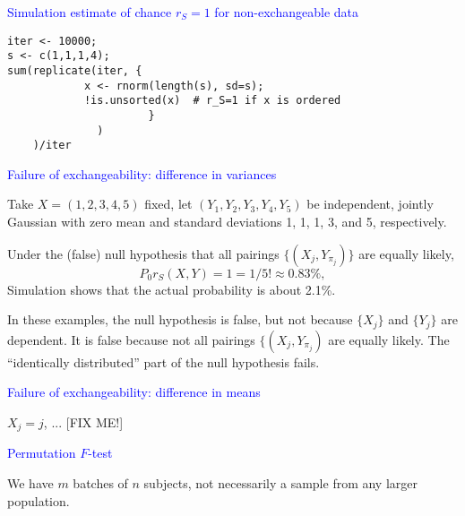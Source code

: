 \documentclass[landscape]{slides}
\newcommand{\beq}{\begin{equation}}
\newcommand{\eeq}{\end{equation}}
\begin{document}
\begin{slide}
\begin{slide}
\end{slide}

\begin{slide}
{\textcolor{blue}{Simulation estimate of chance $r_S = 1$ for non-exchangeable data}}

\begin{verbatim}
iter <- 10000;
s <- c(1,1,1,4);
sum(replicate(iter, {
            x <- rnorm(length(s), sd=s);
            !is.unsorted(x)  # r_S=1 if x is ordered
                      }
              )
    )/iter
\end{verbatim}

\end{slide}

\begin{slide}
{\textcolor{blue}{Failure of exchangeability: difference in variances}}

Take $X = (1, 2, 3, 4, 5)$ fixed,
let $(Y_1, Y_2, Y_3, Y_4, Y_5)$ be independent, jointly Gaussian 
with zero mean and standard deviations 1, 1, 1, 3, and 5, respectively.

Under the (false) null hypothesis that all pairings $\{(X_j, Y_{\pi_j})\}$ are 
equally likely,
\beq
     P_0{r_S(X, Y) = 1} = 1/5! \approx 0.83\%,
\eeq
Simulation shows that the actual probability is about 2.1\%.

In these examples, the null hypothesis is false, but not because
$\{X_j\}$ and $\{Y_j\}$ are dependent.
	It is false because not all pairings $\{(X_j, Y_{\pi_j})$
	are equally likely.
	The ``identically distributed'' part of the null hypothesis
	fails.
\end{slide}

\begin{slide}
{\textcolor{blue}{Failure of exchangeability: difference in means}}

$X_j = j$, ... [FIX ME!]

\end{slide}

\begin{slide}
{\textcolor{blue}{Permutation $F$-test}}

We have $m$ batches of $n$ subjects, not necessarily a sample from any
larger population.


\end{slide}
\end{slide}
\end{document}
